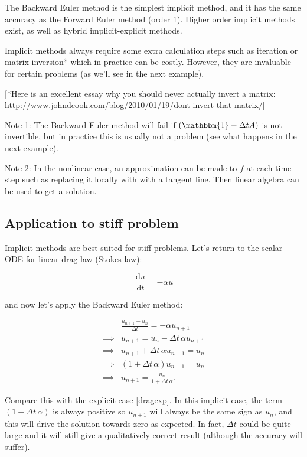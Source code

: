 \documentclass{article}
\newcommand{\ud}{\,\mathrm{d}}
\newcommand{\dt}{\Delta t}
\newcommand{\uni}{u_{n+1}}
\newcommand{\Id}{\mathbbm{1}}
\begin{document}
The Backward Euler method is the simplest implicit method, and it has the same accuracy
as the Forward Euler method (order 1). Higher order implicit methods exist,
as well as hybrid implicit-explicit methods.

Implicit methods always require some extra calculation steps
such as iteration or matrix inversion*
which in practice can be costly. 
However, they are invaluable for certain problems
(as we'll see in the next example).

[*Here is an excellent essay why you should never actually invert a matrix:
http://www.johndcook.com/blog/2010/01/19/dont-invert-that-matrix/]

Note 1: The Backward Euler method
will fail if $(\Id - \dt A)$ is not invertible, but in practice this
is usually not a problem (see what happens in the next example).

Note 2: In the nonlinear case, an approximation can be made to $f$ at each time step
such as replacing it locally with with a tangent line. Then linear algebra can be used
to get a solution.


\subsection{Application to stiff problem}

Implicit methods are best suited for stiff problems.
Let's return to the scalar ODE for linear drag law (Stokes law):

\begin{equation}
    \frac{\ud u}{\ud t} = -\alpha u
\end{equation}

and now let's apply the Backward Euler method:

\begin{equation}
    \begin{split}
        &\frac{\uni - u_n}{\dt} = -\alpha \uni \\
        \implies &\uni = u_n - \dt\,\alpha \uni \\
        \implies &\uni + \dt\,\alpha \uni = u_n \\
        \implies &(1 + \dt\,\alpha )\uni = u_n \\
        \implies &\uni = \frac{u_n}{1 + \dt\,\alpha }.
    \end{split}
\end{equation}

Compare this with the explicit case \eqref{dragexp}.
In this implicit case, the term $(1 + \dt\,\alpha)$ is always positive
so $\uni$ will always be the same sign as $u_n$, and this will drive
the solution towards zero as expected. In fact, $\dt$ could be quite
large and it will still give a qualitatively correct result
(although the accuracy will suffer).
\end{document}
